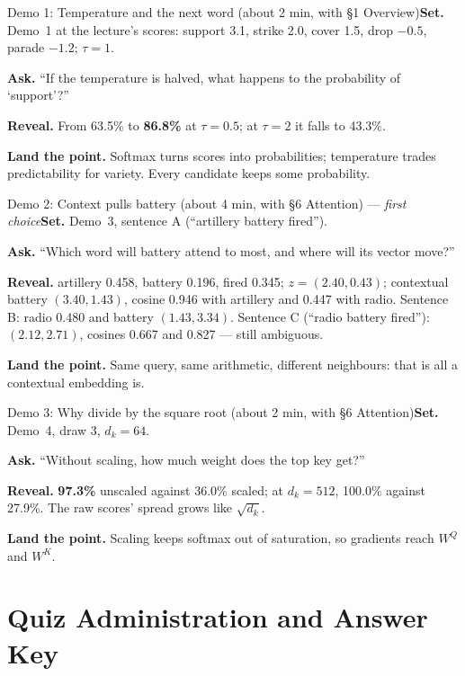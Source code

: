 \documentclass[11pt]{article}
\begin{document}
\begin{live}{Demo 1: Temperature and the next word (about 2 min, with \S1 Overview)}\textbf{Set.} Demo~1 at the lecture's scores: support 3.1, strike 2.0, cover 1.5, drop $-0.5$, parade $-1.2$; $\tau=1$.\par\smallskip\textbf{Ask.} ``If the temperature is halved, what happens to the probability of `support'?''\par\smallskip\textbf{Reveal.} From 63.5\% to \textbf{86.8\%} at $\tau=0.5$; at $\tau=2$ it falls to 43.3\%.\par\smallskip\textbf{Land the point.} Softmax turns scores into probabilities; temperature trades predictability for variety. Every candidate keeps some probability.\end{live}

\begin{live}{Demo 2: Context pulls battery (about 4 min, with \S6 Attention) --- \emph{first choice}}\textbf{Set.} Demo~3, sentence A (``artillery battery fired'').\par\smallskip\textbf{Ask.} ``Which word will battery attend to most, and where will its vector move?''\par\smallskip\textbf{Reveal.} artillery 0.458, battery 0.196, fired 0.345; $z=(2.40,0.43)$; contextual battery $(3.40,1.43)$, cosine 0.946 with artillery and 0.447 with radio. Sentence B: radio 0.480 and battery $(1.43,3.34)$. Sentence C (``radio battery fired''): $(2.12,2.71)$, cosines 0.667 and 0.827 --- still ambiguous.\par\smallskip\textbf{Land the point.} Same query, same arithmetic, different neighbours: that is all a contextual embedding is.\end{live}

\begin{live}{Demo 3: Why divide by the square root (about 2 min, with \S6 Attention)}\textbf{Set.} Demo~4, draw 3, $d_k=64$.\par\smallskip\textbf{Ask.} ``Without scaling, how much weight does the top key get?''\par\smallskip\textbf{Reveal.} \textbf{97.3\%} unscaled against 36.0\% scaled; at $d_k=512$, 100.0\% against 27.9\%. The raw scores' spread grows like $\sqrt{d_k}$.\par\smallskip\textbf{Land the point.} Scaling keeps softmax out of saturation, so gradients reach $W^Q$ and $W^K$.\end{live}

\section{Quiz Administration and Answer Key}
\end{document}
